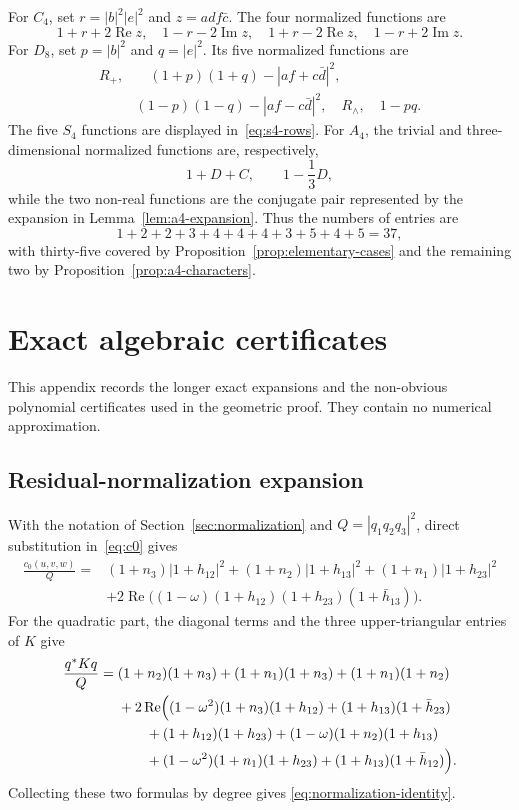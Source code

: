 \documentclass[10pt,twoside]{siamart1116}
\newcommand{\Rea}{\operatorname{Re}}
\newcommand{\Ima}{\operatorname{Im}}
\begin{document}
For $C_4$, set $r=|b|^2|e|^2$ and $z=adf\bar c$.  The four normalized
functions are
\begin{equation}\label{eq:c4-rows}
 1+r+2\Rea z,\quad 1-r-2\Ima z,\quad
 1+r-2\Rea z,\quad 1-r+2\Ima z.
\end{equation}
For $D_8$, set $p=|b|^2$ and $q=|e|^2$.  Its five normalized functions are
\begin{align}
 R_+,&\quad
 (1+p)(1+q)-|af+c\bar d|^2,\nonumber\\
 &(1-p)(1-q)-|af-c\bar d|^2,\quad
 R_\wedge,\quad 1-pq.\label{eq:d8-rows}
\end{align}
The five $S_4$ functions are displayed in~\eqref{eq:s4-rows}.  For $A_4$,
the trivial and three-dimensional normalized functions are, respectively,
\begin{equation}\label{eq:a4-real-rows}
 1+D+C,\qquad 1-\frac13D,
\end{equation}
while the two non-real functions are the conjugate pair represented by the
expansion in Lemma~\ref{lem:a4-expansion}.  Thus the numbers of entries are
\[
 1+2+2+3+4+4+4+3+5+4+5=37,
\]
with thirty-five covered by Proposition~\ref{prop:elementary-cases} and the
remaining two by Proposition~\ref{prop:a4-characters}.

\section{Exact algebraic certificates}\label{app:sos}

This appendix records the longer exact expansions and the non-obvious
polynomial certificates used in the geometric proof.  They contain no
numerical approximation.

\subsection{Residual-normalization expansion}
\label{app:normalization-expansion}

With the notation of Section~\ref{sec:normalization} and
$Q=|q_1q_2q_3|^2$, direct substitution in~\eqref{eq:c0} gives
\begin{align}
\frac{c_0(u,v,w)}{Q}={}&
 (1+n_3)|1+h_{12}|^2+(1+n_2)|1+h_{13}|^2
 +(1+n_1)|1+h_{23}|^2\nonumber\\
&+2\Rea\bigl((1-\omega)(1+h_{12})(1+h_{23})
                   (1+\bar h_{13})\bigr).\label{eq:c0-normalized}
\end{align}
For the quadratic part, the diagonal terms and the three upper-triangular
entries of $K$ give
\begin{align}
\frac{q^*Kq}{Q}={}&
 (1+n_2)(1+n_3)+(1+n_1)(1+n_3)+(1+n_1)(1+n_2)\nonumber\\
&+2\Rea\Bigl(
 (1-\omega^2)(1+n_3)(1+h_{12})
 +(1+h_{13})(1+\bar h_{23})\nonumber\\
&\qquad +(1+h_{12})(1+h_{23})
 +(1-\omega)(1+n_2)(1+h_{13})\nonumber\\
&\qquad +(1-\omega^2)(1+n_1)(1+h_{23})
 +(1+h_{13})(1+\bar h_{12})\Bigr).
\label{eq:K-normalized}
\end{align}
Collecting these two formulas by degree gives
\eqref{eq:normalization-identity}.
\end{document}
